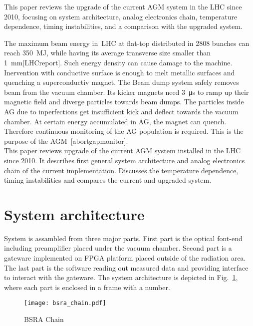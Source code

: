 This paper reviews the upgrade of the current AGM system in the LHC since 2010,
focusing on system architecture, analog electronics chain, temperature
dependence, timing instabilities, and a comparison with the upgraded system.

The maximum beam energy in~LHC at flat-top distributed in 2808 bunches can
reach \SI{350}{MJ}, while having its average transverse size smaller than
\SI{1}{mm}[LHCreport]. Such energy density can cause damage to the machine. 
Inervention with conductive surface is enough to melt metallic surfaces and
quenching a superconductiv magnet. The Beam dump system safely removes beam
from the vacuum chamber. Its kicker magnets need \SI{3}{\micro\second} to ramp
up their magnetic field and diverge particles towards beam dumps. The particles
inside AG due to inperfections get insufficient kick and deflect towards the
vacuum chamber. At certain energy accumulated in AG, the magnet can quench.
Therefore continuous monitoring of the AG population is required. This is the
purpose of the AGM~[abortgapmonitor].\\ 
This paper reviews upgrade of the current AGM system installed in the LHC since
2010. It describes first general system architecture and analog electronics
chain of the current implementation. Discusses the temperature dependence,
timing instabilities and compares the current and upgraded system. 

\section{System architecture}
System is assambled from three major parts. First part is the optical font-end
including preamplifier placed under the vacuum chamber. Second part is a
gateware implemented on FPGA platform placed outside of the radiation area. The
last part is the software reading out measured data and providing interface to
interact with the gateware. The system architecture is depicted in
Fig.~\ref{fig:bsra_chain}, where each part is enclosed in a frame with a
number.
\begin{figure}[!tbh]
    \centering
    \texttt{[image: bsra\_chain.pdf]}
    \caption{BSRA Chain}
    \label{fig:bsra_chain}
\end{figure}

